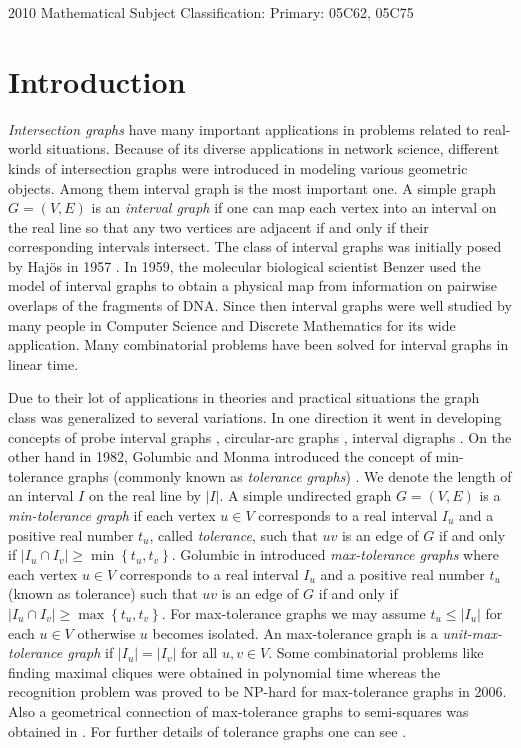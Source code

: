 \documentclass{article}
\theoremstyle{definition}
\numberwithin{equation}{section}
\newcommand{\set}[1]{\left\{#1\right\}}
\begin{document}
\noindent
{\scriptsize 2010 Mathematical Subject Classification:} {\footnotesize Primary: 05C62, 05C75}

\section{Introduction}
{\em Intersection graphs} have many important applications in problems related to real-world situations. Because of its diverse applications in network science, different kinds of intersection graphs were introduced in modeling various geometric objects. Among them interval graph is the most important one. A simple graph $G = (V, E)$ is an \textit{interval graph} if one can map each vertex into an interval on the real line so that any two vertices are adjacent if and only if their corresponding intervals intersect. The class of interval graphs was initially posed by Haj\"{o}s in 1957 \cite{Hajos}.
In 1959, the molecular biological scientist Benzer \cite{Benzer} used the model of interval graphs to obtain a physical map from information on pairwise overlaps of the fragments of DNA.
Since then interval graphs were well studied by many people in Computer Science and Discrete Mathematics for its wide application. Many combinatorial problems have been solved for interval graphs in linear time.

\vspace{0.3em}

\noindent Due to their lot of applications in theories and practical situations the graph class was generalized to several variations. In one direction it went in developing concepts of probe interval graphs \cite{Sg}, circular-arc graphs \cite{BDGS}, interval digraphs \cite{Sen}. On the other hand in 1982, Golumbic and Monma introduced the concept of min-tolerance graphs (commonly known as \textit{tolerance graphs}) \cite{Golumbic1}. We denote the length of an interval $I$ on the real line by $|I|$. A simple undirected graph $G=(V,E)$ is a {\em min-tolerance graph} if each vertex $u\in V$ corresponds to a real interval $I_u$ and a positive real number $t_u$, called {\em tolerance}, such that $uv$ is an edge of $G$ if and only if $|I_u\cap I_v|\geq \min \set{t_u,t_v}$. Golumbic in \cite{Golumbic2} introduced \textit{max-tolerance graphs} where each vertex $u\in V$ corresponds to a real interval $I_u$ and a  positive real number $t_u$ (known as tolerance) such that $uv$ is an edge of $G$ if and only if $|I_u\cap I_v|\geqslant \max\set{t_u,t_v}$. For max-tolerance graphs we may assume $t_{u}\leq |I_{u}|$ for each $u\in V$ otherwise $u$ becomes isolated. An max-tolerance graph is a {\em unit-max-tolerance graph} if $|I_u|=|I_v|$ for all $u,v\in V$. Some combinatorial problems like finding maximal cliques were obtained in polynomial time whereas the recognition problem was proved to be NP-hard \cite{Kaufmann} for max-tolerance graphs in 2006. Also a geometrical connection of max-tolerance graphs to semi-squares was obtained in \cite{Kaufmann}. For further details of tolerance graphs one can see \cite{Golumbic2}.
\end{document}
